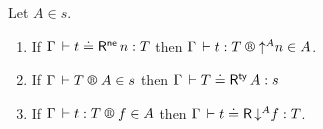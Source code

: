 \documentclass[acmlarge,review,anonymous]{acmart}\settopmatter{printfolios=true}
\begin{document}
\begin{theorem}
\label{thm:into}
\bla
Let $A \in s$.
\begin{enumerate}

\item \label{it:into}
   If\/ $\Gamma \,\vdash t \doteq \mathsf{R}^{\mathsf{ne}}\,n : T$ then
   $\LR \Gamma t T {\up A n} A$.

\item \label{it:outty}
   If\/ $\LRTS{\Gamma} T A s$ then
   $\Gamma \,\vdash T \doteq \mathsf{R}^{\mathsf{ty}}\,A : s$

\item \label{it:out}
  If\/ $\LR \Gamma t T f A$ then
  $\Gamma \,\vdash t \doteq \mathsf{R}\,\mathord{\downarrow^{A}} f : T$.




\end{enumerate}
\end{theorem}
\end{document}
